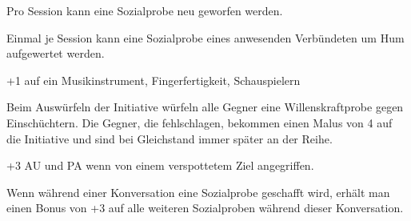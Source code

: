 \documentclass[../../Heldenanleitung2]{subfiles}
\begin{document}
\begin{multicols}{2}

\begin{tcolorbox}[title={Gelassenheit}, colbacktitle=yellow, coltitle=black]    
   Pro Session kann eine Sozialprobe neu geworfen werden.
\end{tcolorbox}

\begin{tcolorbox}[title={Überspielen}, colbacktitle=yellow, coltitle=black]    
   Einmal je Session kann eine Sozialprobe eines anwesenden Verbündeten um Hum aufgewertet werden.
\end{tcolorbox}

\begin{tcolorbox}[title={Gauklertum}, colbacktitle=yellow, coltitle=black]    
   +1 auf ein Musikinstrument, Fingerfertigkeit, Schauspielern
\end{tcolorbox}



\begin{tcolorbox}[title={Beeindruckende Gestalt}, colbacktitle=yellow, coltitle=black]    
   Beim Auswürfeln der Initiative würfeln alle Gegner eine Willenskraftprobe gegen Einschüchtern. Die Gegner, die fehlschlagen, bekommen einen Malus von 4 auf die Initiative und sind bei Gleichstand immer später an der Reihe.
\end{tcolorbox}

\begin{tcolorbox}[title={Provokator}, colbacktitle=yellow, coltitle=black]	
   +3 AU und PA wenn von einem verspottetem Ziel angegriffen.
\end{tcolorbox}

\begin{tcolorbox}[title={Konversationist}, colbacktitle=yellow, coltitle=black]    
   Wenn während einer Konversation eine Sozialprobe geschafft wird, erhält man einen Bonus von +3 auf alle weiteren Sozialproben während dieser Konversation.
\end{tcolorbox}


\end{multicols}
\end{document}
